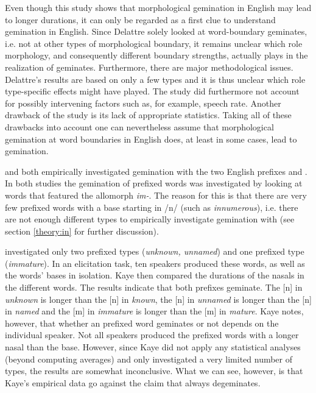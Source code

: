 Even though this study shows that morphological gemination in English may lead to longer durations, it can only be regarded as a first clue to understand gemination in English. Since Delattre solely looked at word-boundary geminates, i.e. not at other types of morphological boundary, it remains unclear which role morphology, and consequently different boundary strengths, actually plays in the realization of geminates. Furthermore, there are major methodological issues. Delattre's results are based on only a few types and it is thus unclear which role type-specific effects might have played. The study did furthermore not account for possibly intervening factors such as, for example, speech rate. Another drawback of the study is its lack of appropriate statistics. Taking all of these drawbacks into account one can nevertheless assume that morphological gemination at word boundaries in English does, at least in some cases, lead to gemination.


\citet{Kaye.2005} and \citet{Oh.2012} both empirically investigated gemination with the two English prefixes  and . In both studies the gemination of prefixed words was investigated by looking at words that featured the allomorph \textit{im-}. The reason for this is that there are very few prefixed words with a base starting in /n/ (such as \textit{innumerous}), i.e. there are not enough different types to empirically investigate gemination with  (see section \ref{theory:in} for further discussion). 


\cite{Kaye.2005} investigated  only two prefixed types (\textit{unknown, unnamed}) and one  prefixed type (\textit{immature}). In an elicitation task, ten speakers produced these words, as well as the words’ bases in isolation. Kaye then compared the durations of the nasals in the different words. The results indicate that both prefixes geminate. The [n] in \textit{unknown} is longer than the [n] in \textit{known},  the [n] in \textit{unnamed} is longer than the [n] in \textit{named} and the [m] in \textit{immature} is longer than the [m] in \textit{mature}. Kaye notes, however, that whether an prefixed word geminates or not depends  on the individual speaker. Not all speakers produced the prefixed words with a longer nasal than the base. However, since Kaye did not apply any statistical analyses (beyond computing averages) and only investigated a very limited number of types, the results are somewhat inconclusive. What we can see, however, is that Kaye's empirical data go against the claim that  always degeminates.


